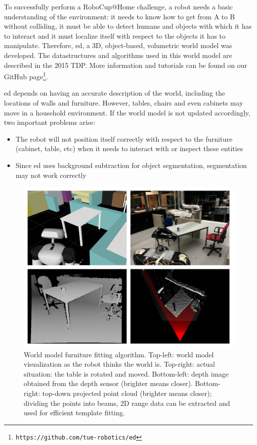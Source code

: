 To successfully perform a RoboCup@Home challenge, a robot needs a basic understanding of the environment: it needs to know how to get from A to B without colliding, it must be able to detect humans and objects with which it has to interact and it must localize itself with respect to the objects it has to manipulate.
Therefore, \gls{ed}, a 3D, object-based, volumetric world model was developed.
The datastructures and algorithms used in this world model are described in the 2015 TDP.
More information and tutorials can be found on our GitHub page\footnote{\texttt{https://github.com/tue-robotics/ed}}.

\gls{ed} depends on having an accurate description of the world, including the locations of walls and furniture.
However, tables, chairs and even cabinets may move in a household environment.
If the world model is not updated accordingly, two important problems arise:

\begin{itemize}
    \item The robot will not position itself correctly with respect to the furniture (cabinet, table, etc) when it needs to interact with or inspect these entities
    \item Since \gls{ed} uses background subtraction for object segmentation, segmentation may not work correctly
\end{itemize}

\begin{figure}[ht]
        \includegraphics[width = \linewidth]{Figures/fitting-small}
        \caption{World model furniture fitting algorithm. Top-left: world model visualization as the robot thinks the world is. Top-right: actual situation: the table is rotated and moved. Bottom-left: depth image obtained from the depth sensor (brighter means closer). Bottom-right: top-down projected point cloud (brighter means closer); dividing the points into beams, 2D range data can be extracted and used for efficient template fitting.}
        \label{fig:fitting}
\end{figure}

